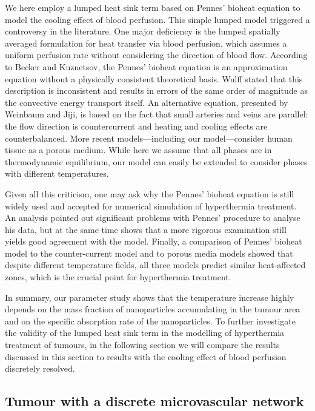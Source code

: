 \documentclass[Times1COL,AMA]{WileyNJDv5} %
\begin{document}
We here employ a lumped heat sink term based on Pennes' bioheat equation to model the cooling effect of blood perfusion.
This simple lumped model triggered a controversy in the literature.
One major deficiency is the lumped spatially averaged formulation for heat transfer via blood perfusion, which assumes a uniform perfusion rate without considering the direction of blood flow.
According to Becker and Kuznetsov, \cite{Becker2015} the Pennes' bioheat equation is an approximation equation without a physically consistent theoretical basis.
Wulff \cite{Wulff1974} stated that this description is inconsistent and results in errors of the same order of magnitude as the convective energy transport itself.
An alternative equation, presented by Weinbaum and Jiji, \cite{Weinbaum1985} is based on the fact that small arteries and veins are parallel:
the flow direction is countercurrent and heating and cooling effects are counterbalanced.
More recent models---including our model---consider human tissue as a porous medium. \cite{Khaled2003,Nakayama2008}
While here we assume that all phases are in thermodynamic equilibrium, our model can easily be extended to consider phases with different temperatures.

Given all this criticism, one may ask why the Pennes' bioheat equation is still widely used and accepted for numerical simulation of hyperthermia treatment.
An analysis \cite{Wissler1998} pointed out significant problems with Pennes' procedure to analyse his data, but at the same time shows that a more rigorous examination still yields good agreement with the model.
Finally, a comparison \cite{Hassanpour2014} of Pennes' bioheat model to the counter-current model and to porous media models showed that despite different temperature fields, all three models predict similar heat-affected zones, which is the crucial point for hyperthermia treatment.

In summary, our parameter study shows that the temperature increase highly depends on the mass fraction of nanoparticles accumulating in the tumour area and on the specific absorption rate of the nanoparticles.
To further investigate the validity of the lumped heat sink term in the modelling of hyperthermia treatment of tumours, in the following section we will compare the results discussed in this section to results with the cooling effect of blood perfusion discretely resolved.

\subsection{Tumour with a discrete microvascular network}
\label{sec:TumourDiscreteVasculature}
\end{document}
